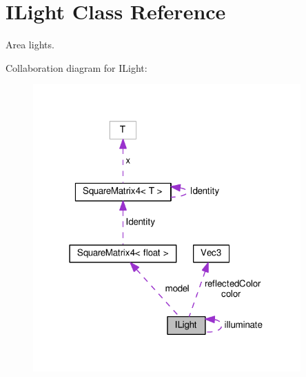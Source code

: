 \hypertarget{class_i_light}{}\section{I\+Light Class Reference}
\label{class_i_light}


Area lights.  




Collaboration diagram for I\+Light\+:
\nopagebreak
\begin{figure}[H]
\begin{center}
\leavevmode
\includegraphics[width=291pt]{class_i_light__coll__graph}
\end{center}
\end{figure}
